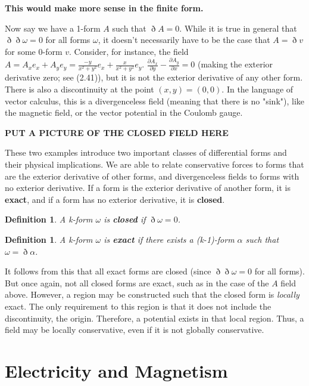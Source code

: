 \documentclass{book}
\newtheorem{defn}[equation]{Definition}
\begin{document}
\textbf{This would make more sense in the finite form.}

Now say we have a 1-form $A$ such that $\eth A = 0.$ While it is true in general that $\eth\eth\omega = 0$ for all forms $\omega$, it doesn't necessarily have to be the case that $A = \eth v$ for some 0-form $v.$ Consider, for instance, the field $A = A_x e_x + A_y e_y = \frac{-y}{x^2 + y^2} e_x + \frac{x}{x^2 + y^2} e_y$. $\frac{\partial A_x}{\partial y} - \frac{\partial A_y}{\partial x} = 0$ (making the exterior derivative zero; see (2.41)), but it is not the exterior derivative of any other form. There is also a discontinuity at the point $(x,y) = (0,0)$. In the language of vector calculus, this is a divergenceless field (meaning that there is no "sink"), like the magnetic field, or the vector potential in the Coulomb gauge.  

\textbf{PUT A PICTURE OF THE CLOSED FIELD HERE}

These two examples introduce two important classes of differential forms and their physical implications. We are able to relate conservative forces to forms that are the exterior derivative of other forms, and divergenceless fields to forms with no exterior derivative. If a form is the exterior derivative of another form, it is \textbf{exact}, and if a form has no exterior derivative, it is \textbf{closed}.
 
\begin{defn} 
	A k-form \textbf{$\omega$} is \textbf{closed} if $\eth\omega = 0$. 
\end{defn}

\begin{defn} 
	A k-form \textbf{$\omega$} is \textbf{exact} if there exists a (k-1)-form $\alpha$ such that $\omega = \eth\alpha$.
\end{defn}



It follows from this that all exact forms are closed (since $\eth\eth\omega = 0$ for all forms). But once again, not all closed forms are exact, such as in the case of the $A$ field above. However, a region may be constructed such that the closed form is \emph{locally} exact. The only requirement to this region is that it does not include the discontinuity, the origin. Therefore, a potential exists in that local region. Thus, a field may be locally conservative, even if it is not globally conservative. 

\section{Electricity and Magnetism}
\end{document}
